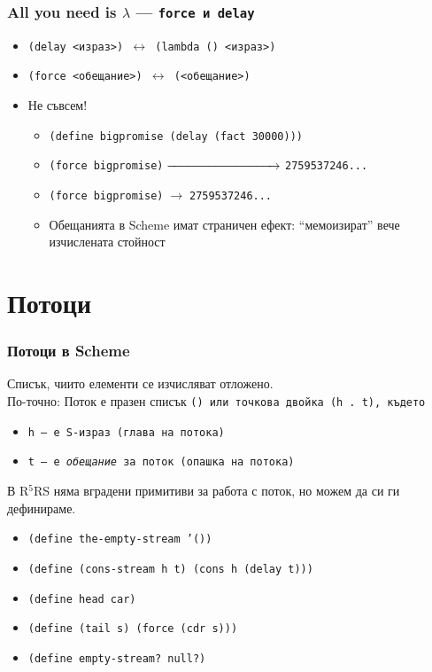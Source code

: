 \documentclass{beamer}
\begin{document}
\begin{frame}
  \frametitle{All you need is $\lambda$ --- \tt{force} и \tt{delay}}
  \begin{itemize}
  \item \tt{(delay }<израз>\tt) $\leftrightarrow$ \tt{(lambda () <израз>)}
  \item \tt{(force }<обещание>\tt) $\leftrightarrow$ \tt{(<обещание>)}\pause
  \item \alert{Не съвсем!} \pause
    \begin{itemize}[<.->]
    \item \tt{(define bigpromise (delay (fact 30000)))}
    \item \tt{(force bigpromise)}$\;\xrightarrow{\hspace*{3cm}}\;$\tt{2759537246...}
    \item \tt{(force bigpromise)}$\;\rightarrow\;$\tt{2759537246...} \pause
    \item Обещанията в Scheme имат страничен ефект: ``мемоизират'' вече изчислената стойност
    \end{itemize}
  \end{itemize}
\end{frame}

\section{Потоци}

\begin{frame}
  \frametitle{Потоци в Scheme}
  \begin{definition}[Поток]
    Списък, чиито елементи се изчисляват отложено. \\
    \pause
    По-точно: Поток е празен списък \tt{()} или точкова двойка \tt{(h . t)}, където
      \begin{itemize}
      \item \tt h --- е S-израз (глава на потока)
      \item \tt t --- е \emph{обещание} за поток (опашка на потока)
      \end{itemize}
  \end{definition}
  \pause
  В R$^5$RS няма вградени примитиви за работа с поток, но можем да си ги дефинираме.
  \pause
  \begin{itemize}[<+->]
  \item \tt{(define the-empty-stream '())}
  \item \tt{(define (cons-stream h t) (cons h (delay t)))}
  \item \tt{(define head car)}
  \item \tt{(define (tail s) (force (cdr s)))}
  \item \tt{(define empty-stream? null?)}
  \end{itemize}
\end{frame}
\end{document}
